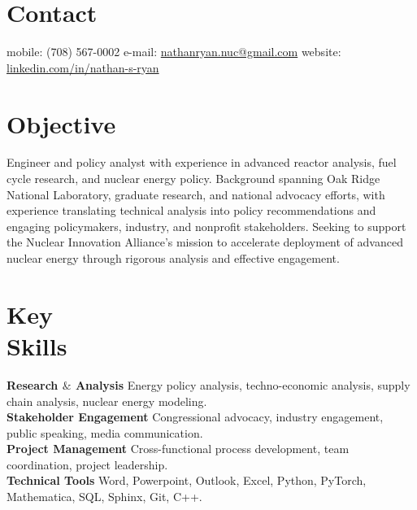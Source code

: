 \documentclass[margin,line]{resume}
\begin{document}
\begin{resume}

%


    \section{\mysidestyle Contact}
    mobile: (708) 567-0002 \hfill e-mail: \href{mailto:nathanryan.nuc@gmail.com}{nathanryan.nuc@gmail.com} \hfill website: \href{https://www.linkedin.com/in/nathan-s-ryan/}{linkedin.com/in/nathan-s-ryan} \vspace{0mm}\\\vspace{1mm}%

    \vspace{-6mm}
    \section{\mysidestyle Objective}

        Engineer and policy analyst with experience in advanced reactor analysis, fuel cycle research, and nuclear energy policy. Background spanning Oak Ridge National Laboratory, graduate research, and national advocacy efforts, with experience translating technical analysis into policy recommendations and engaging policymakers, industry, and nonprofit stakeholders. Seeking to support the Nuclear Innovation Alliance's mission to accelerate deployment of advanced nuclear energy through rigorous analysis and effective engagement.
    \section{\mysidestyle Key\\Skills}
        \textbf{Research $\&$ Analysis} Energy policy analysis, techno-economic analysis, supply chain analysis, nuclear energy modeling.\vspace{1mm}\\
        \textbf{Stakeholder Engagement} Congressional advocacy, industry engagement, public speaking, media communication.\vspace{1mm}\\
        \textbf{Project Management} Cross-functional process development, team coordination, project leadership.\vspace{1mm}\\
        \textbf{Technical Tools} Word, Powerpoint, Outlook, Excel, Python, PyTorch, Mathematica, SQL, Sphinx, Git, C++.\vspace{1mm}


\end{resume}
\end{document}
